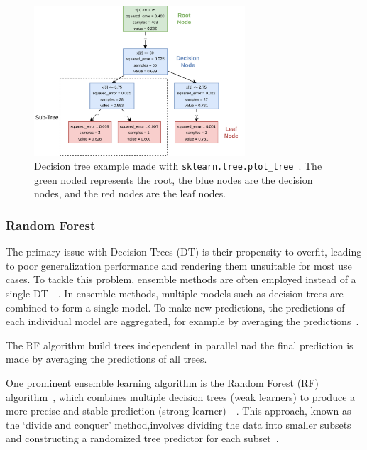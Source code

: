 \begin{figure}[h]
    \begin{tcolorbox}[arc=0pt,boxrule=0.5pt]
        \centering
        \includegraphics[width=0.7\textwidth]{chap4/images/decision_tree_example}
    \end{tcolorbox}
    \caption{Decision tree example made with \texttt{sklearn.tree.plot\_tree}~\cite{scikit-learn}.
    The green noded represents the root, the blue nodes are the decision nodes, and the red nodes are the leaf nodes.}
    \label{fig:dt-example}
\end{figure}

\subsubsection{Random Forest}\label{subsubsec:random-forests}
The primary issue with Decision Trees (\ac{DT}) is their propensity to overfit, leading to poor generalization
performance and rendering them unsuitable for most use cases.
To tackle this problem, ensemble methods are often employed instead of a single
DT~\cite[p. 78]{muller_introductionmachinelearning_2016}~\cite[p. 251]{liu_newmachinelearning_2012}.
In ensemble methods, multiple models such as decision trees are combined to form a single model. To make new
predictions, the predictions of each individual model are aggregated, for example by averaging the
predictions~\cite[p. 222]{boehmke2019hands}.

The \ac{RF} algorithm build trees independent in parallel nad the final prediction is made by averaging the predictions
of all trees.

One prominent ensemble learning algorithm is the Random Forest
(\ac{RF}) algorithm~\cite[]{breiman_randomforests_2001}, which combines multiple decision trees (weak learners) to
produce a more precise and stable prediction
(strong learner)~\cite[p. 24]{awad_efficientlearningmachines_2015}~\cite[pp. 340]{gareth2013introduction}.
This approach, known as the `divide and conquer' method,involves dividing the data into smaller subsets and
constructing a randomized tree predictor for each subset~\cite[p. 251]{liu_newmachinelearning_2012}.

